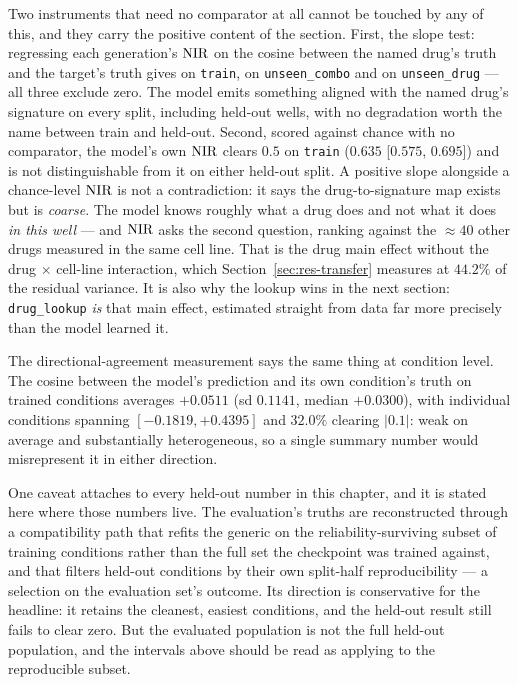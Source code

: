 Two instruments that need no comparator at all cannot be touched by any of this, and they carry the
positive content of the section. First, the slope test: regressing each generation's $\textrm{NIR}$ on the
cosine between the named drug's truth and the target's truth gives  on
\texttt{train},  on \texttt{unseen\_combo} and
 on \texttt{unseen\_drug} --- all three exclude zero. The model emits
something aligned with the named drug's signature on every split, including held-out wells, with no
degradation worth the name between train and held-out. Second, scored against chance with no
comparator, the model's own $\textrm{NIR}$ clears $0.5$ on \texttt{train} ($0.635$ [$0.575$, $0.695$]) and
is not distinguishable from it on either held-out split. A positive slope alongside a chance-level
$\textrm{NIR}$ is not a contradiction: it says the drug-to-signature map exists but is \emph{coarse}. The
model knows roughly what a drug does and not what it does \emph{in this well} --- and $\textrm{NIR}$ asks
the second question, ranking against the $\approx 40$ other drugs measured in the same cell line.
That is the drug main effect without the drug $\times$ cell-line interaction, which
Section~\ref{sec:res-transfer} measures at $44.2\%$ of the residual variance. It is also why the
lookup wins in the next section: \texttt{drug\_lookup} \emph{is} that main effect, estimated
straight from data far more precisely than the model learned it.

The directional-agreement measurement says the same thing at condition level. The cosine between
the model's prediction and its own condition's truth on trained conditions averages $+0.0511$
(sd $0.1141$, median $+0.0300$), with individual conditions spanning $[-0.1819, +0.4395]$ and
$32.0\%$ clearing $|0.1|$: weak on average and substantially heterogeneous, so a single summary
number would misrepresent it in either direction.

One caveat attaches to every held-out number in this chapter, and it is stated here where those
numbers live. The evaluation's truths are reconstructed through a compatibility path that refits
the generic on the reliability-surviving subset of training conditions rather than the full set the
checkpoint was trained against, and that filters held-out conditions by their own split-half
reproducibility --- a selection on the evaluation set's outcome. Its direction is conservative for
the headline: it retains the cleanest, easiest conditions, and the held-out result still fails to
clear zero. But the evaluated population is not the full held-out population, and the intervals
above should be read as applying to the reproducible subset.

